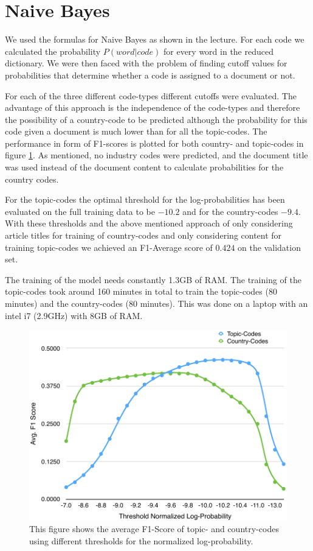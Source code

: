 \documentclass{article}
\begin{document}
\section*{Naive Bayes}
We used the formulas for Naive Bayes as shown in the lecture. For each code we calculated the probability $P(word | code)$ for every word in the reduced dictionary. We were then faced with the problem of finding cutoff values for probabilities that determine whether a code is assigned to a document or not.

For each of the three different code-types different cutoffs were evaluated. The advantage of this approach is the independence of the code-types and therefore the possibility of a country-code to be predicted although the probability for this code given a document is much lower than for all the topic-codes. The performance in form of F1-scores is plotted for both country- and topic-codes in figure \ref{fig_bayesThreshold}. As mentioned, no industry codes were predicted, and the document title was used instead of the document content to calculate probabilities for the country codes.

For the topic-codes the optimal threshold for the log-probabilities has been evaluated on the full training data to be $-10.2$ and for the country-codes $-9.4$. With these thresholds and the above mentioned approach of only considering article titles for training of country-codes and only considering content for training topic-codes we achieved an F1-Average score of $0.424$ on the validation set.

The training of the model needs constantly 1.3GB of RAM. The training of the topic-codes took around 160 minutes in total to train the topic-codes (80 minutes) and the country-codes (80 minutes). This was done on a laptop with an intel i7 (2.9GHz) with 8GB of RAM.



\begin{figure}[h!]
    \centering
    \includegraphics[scale=0.6]{graphics/BayesF1ScoreTopicCountry.pdf}
    \caption{This figure shows the average F1-Score of topic- and country-codes using different thresholds for the normalized log-probability.}
    \label{fig_bayesThreshold}
\end{figure}
\end{document}
